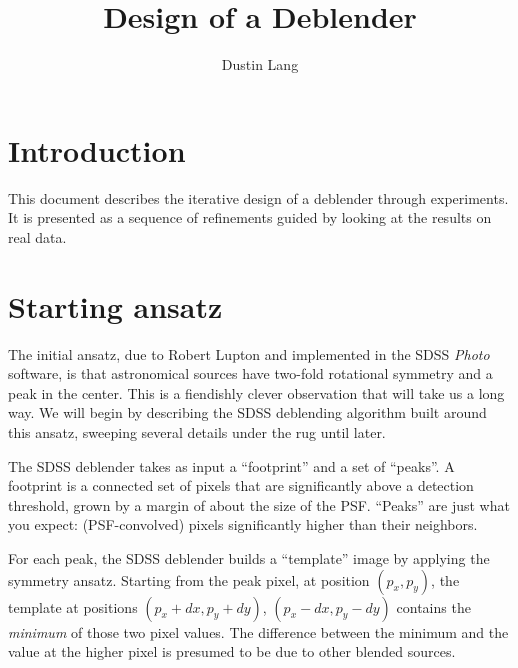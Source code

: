 \documentclass[10pt,letter]{article}
\author{Dustin Lang}
\title{Design of a Deblender}
\begin{document}
\maketitle

\section{Introduction}

This document describes the iterative design of a deblender through
experiments.  It is presented as a sequence of refinements guided by
looking at the results on real data.


%
% 


\section{Starting ansatz}

The initial ansatz, due to Robert Lupton \cite{rhldeblend} and
implemented in the SDSS \emph{Photo} software, is that astronomical
sources have two-fold rotational symmetry and a peak in the center.
This is a fiendishly clever observation that will take us a long way.
We will begin by describing the SDSS deblending algorithm built around
this ansatz, sweeping several details under the rug until later.

The SDSS deblender takes as input a ``footprint'' and a set of
``peaks''.  A footprint is a connected set of pixels that are
significantly above a detection threshold, grown by a margin of about
the size of the PSF.  ``Peaks'' are just what you expect:
(PSF-convolved) pixels significantly higher than their neighbors.

For each peak, the SDSS deblender builds a ``template'' image by
applying the symmetry ansatz.  Starting from the peak pixel, at
position $(p_x,p_y)$, the template at positions $(p_x + dx, p_y +
dy)$, $(p_x - dx, p_y - dy)$ contains the \emph{minimum} of those two
pixel values.  The difference between the minimum and the value at the
higher pixel is presumed to be due to other blended sources.
\end{document}
